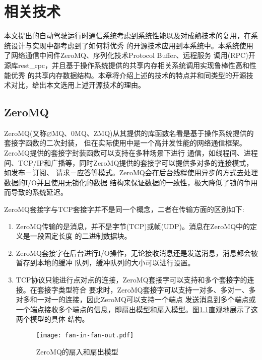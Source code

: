 \chapter{相关技术}
本文提出的自动驾驶运行时通信系统考虑到系统性能以及对成熟技术的复用，在系统设计与实现中都考虑到了如何将优秀
的开源技术应用到本系统中。本系统使用了网络通信中间件ZeroMQ、序列化技术Protocol Buffer、远程服务
调用(RPC)开源库rest\_rpc，并且基于操作系统提供的共享内存相关系统调用实现鲁棒性高和性能优秀
的共享内存数据结构。本章将介绍上述的技术的特点并和同类型的开源技术对比，给出本文选用上述开源技术的理由。
\section{ZeroMQ}
ZeroMQ(又称$\varnothing$MQ、0MQ、ZMQ)从其提供的库函数名看是基于操作系统提供的套接字函数的二次封装\cite{wangpeng}，
但在实际使用中是一个高并发性能的网络通信框架。ZeroMQ提供的套接字封装函数可以支持在多种场景下进行
通信，如线程间、进程间、TCP/IP和广播等，同时ZeroMQ提供的套接字可以提供多对多的连接模式，如发布－订阅、
请求－应答等模式\cite{pfp}。ZeroMQ会在后台线程使用异步的方式去处理数据的I/O并且使用无锁化的数据
结构来保证数据的一致性，极大降低了锁的争用而导致的系统延迟\cite{swp}。

ZeroMQ套接字与TCP套接字并不是同一个概念，二者在传输方面的区别如下:
\begin{enumerate}
    \item ZeroMQ传输的是消息，并不是字节(TCP)或帧(UDP)。消息在ZeroMQ中的定义是一段固定长度
    的二进制数据块。
    \item ZeroMQ套接字在后台进行I/O操作，无论接收消息还是发送消息，消息都会被暂存到本地的缓冲
    队列，缓冲队列的大小可以进行设置。
    \item TCP协议只能进行点对点的连接，ZeroMQ套接字可以支持和多个套接字的连接。在套接字类型符合
    要求时，ZeroMQ套接字可以支持一对多、多对一、多对多和一对一的连接，因此ZeroMQ可以支持一个端点
    发送消息到多个端点或一个端点接收多个端点的信息，即扇出模型和扇入模型。图\ref{fan-in-fan-out}直观地展示了这两个模型的具体
    结构。
    \begin{figure}[H]
        \centering
        \texttt{[image: fan-in-fan-out.pdf]}
        \caption{ZeroMQ的扇入和扇出模型}
        \label{fan-in-fan-out}
      \end{figure}
\end{enumerate}

